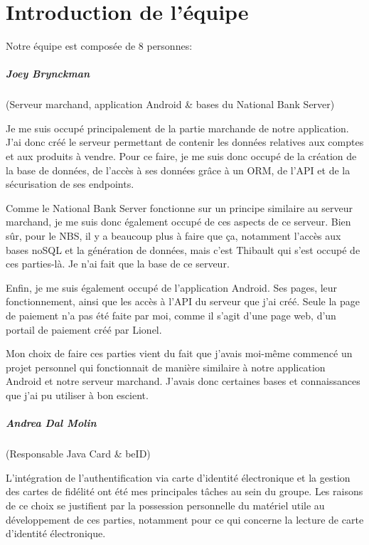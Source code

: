 \chapter{Introduction de l'équipe}

Notre équipe est composée de 8 personnes:

\paragraph{Joey Brynckman} (Serveur marchand, application Android \& bases du National Bank Server)

Je me suis occupé principalement de la partie marchande de notre application. J'ai donc créé le serveur
permettant de contenir les données relatives aux comptes et aux produits à vendre. Pour ce faire, je me
suis donc occupé de la création de la base de données, de l'accès à ses données grâce à un ORM, de l'API
et de la sécurisation de ses endpoints.

Comme le National Bank Server fonctionne sur un principe similaire au serveur marchand, je me suis
donc également occupé de ces aspects de ce serveur. Bien sûr, pour le NBS, il y a beaucoup plus à faire
que ça, notamment l'accès aux bases noSQL et la génération de données, mais c'est Thibault qui s'est
occupé de ces parties-là. Je n'ai fait que la base de ce serveur.

Enfin, je me suis également occupé de l'application Android. Ses pages, leur fonctionnement, ainsi que
les accès à l'API du serveur que j'ai créé. Seule la page de paiement n'a pas été faite par moi, comme il
s'agit d'une page web, d'un portail de paiement créé par Lionel.

Mon choix de faire ces parties vient du fait que j'avais moi-même commencé un projet personnel qui
fonctionnait de manière similaire à notre application Android et notre serveur marchand. J'avais donc
certaines bases et connaissances que j'ai pu utiliser à bon escient.

\paragraph{Andrea Dal Molin} (Responsable Java Card \& beID)

L'intégration de l'authentification via carte d'identité électronique et la gestion des cartes de fidélité ont été mes principales tâches au sein du groupe. Les raisons de ce choix se justifient par la possession personnelle du matériel utile au développement de ces parties, notamment pour ce qui concerne la lecture de carte d'identité électronique. 

